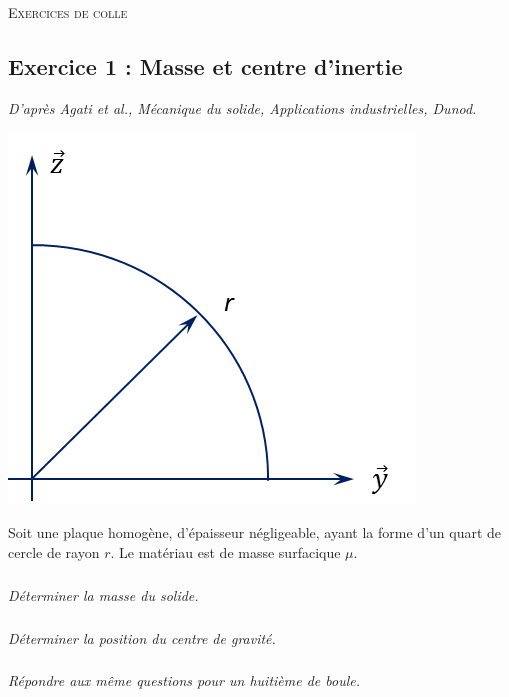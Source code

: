 \documentclass[10pt]{article}
\begin{document}

\begin{center}
\Large{\textsc{Exercices de colle}}
\end{center}

\vspace{.5cm}


\subsection*{Exercice 1 : Masse et centre d'inertie}
\begin{flushright}
\textit{D'après Agati et al., Mécanique du solide, Applications industrielles, Dunod.}
\end{flushright}
\setcounter{subparagraph}{0}

\begin{minipage}[c]{.3\linewidth}
\begin{center}
\includegraphics[width=.9\textwidth]{images/disque}
\end{center}
\end{minipage}\hfill
\begin{minipage}[c]{.65\linewidth}
Soit une plaque homogène, d'épaisseur négligeable, ayant la forme d'un quart de cercle de rayon $r$. Le matériau est de masse surfacique $\mu$.

\subparagraph{}
\textit{Déterminer la masse du solide.}

\subparagraph{}
\textit{Déterminer la position du centre de gravité.}


\subparagraph{}
\textit{Répondre aux même questions pour un huitième de boule.}

\end{minipage}
\end{document}
